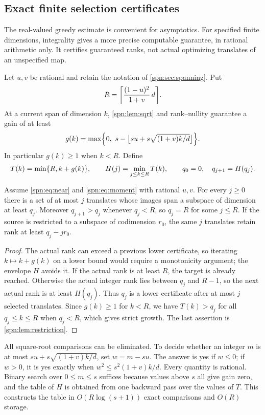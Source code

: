 \subsection{Exact finite selection certificates}\label{spn:sec:certificates}

The real-valued greedy estimate is convenient for asymptotics. For specified
finite dimensions, integrality gives a more precise computable guarantee, in
rational arithmetic only. It certifies guaranteed ranks, not actual optimizing
translates of an unspecified map.

Let $u,v$ be rational and retain the notation of \cref{spn:sec:spanning}. Put
\[
 R=\ceil*{\frac{(1-u)^2}{1+v}\,d}.
\]
At a current span of dimension $k$, \cref{spn:lem:sqrt} and rank--nullity
guarantee a gain of at least
\[
 g(k)=\max\Bigl\{0,\ s-\floor[\big]{su+s\sqrt{(1+v)k/d}}\Bigr\}.
\]
In particular $g(k)\ge1$ when $k<R$. Define
\[
 T(k)=\min\{R,k+g(k)\},\qquad H(j)=\min_{j\le k\le R}T(k),\qquad
 q_0=0,\quad q_{j+1}=H(q_j).
\]

\begin{proposition}\label{spn:prop:envelope}
Assume \eqref{spn:eq:near} and \eqref{spn:eq:moment} with rational $u,v$. For
every $j\ge0$ there is a set of at most $j$ translates whose images span a
subspace of dimension at least $q_j$. Moreover $q_{j+1}>q_j$ whenever $q_j<R$,
so $q_j=R$ for some $j\le R$. If the source is restricted to a subspace of
codimension $r_0$, the same $j$ translates retain rank at least $q_j-jr_0$.
\end{proposition}

\begin{proof}
The actual rank can exceed a previous lower certificate, so iterating
$k\mapsto k+g(k)$ on a lower bound would require a monotonicity argument; the
envelope $H$ avoids it. If the actual rank is at least $R$, the target is
already reached. Otherwise the actual integer rank lies between $q_j$ and
$R-1$, so the next actual rank is at least $H(q_j)$. Thus $q_j$ is a lower
certificate after at most $j$ selected translates. Since $g(k)\ge1$ for $k<R$,
we have $T(k)>q_j$ for all $q_j\le k\le R$ when $q_j<R$, which gives strict
growth. The last assertion is \cref{spn:lem:restriction}.
\end{proof}

All square-root comparisons can be eliminated. To decide whether an integer
$m$ is at most $su+s\sqrt{(1+v)k/d}$, set $w=m-su$. The answer is yes if
$w\le0$; if $w>0$, it is yes exactly when $w^2\le s^2(1+v)k/d$. Every quantity
is rational. Binary search over $0\le m\le s$ suffices because values above
$s$ all give gain zero, and the table of $H$ is obtained from one backward pass
over the values of $T$. This constructs the table in $O(R\log(s+1))$ exact
comparisons and $O(R)$ storage.

